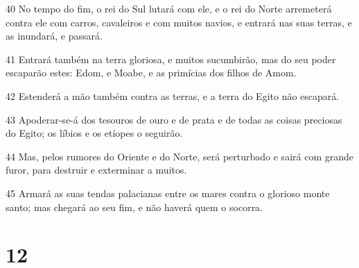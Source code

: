 \par 40 No tempo do fim, o rei do Sul lutará com ele, e o rei do Norte arremeterá contra ele com carros, cavaleiros e com muitos navios, e entrará nas suas terras, e as inundará, e passará.
\par 41 Entrará também na terra gloriosa, e muitos sucumbirão, mas do seu poder escaparão estes: Edom, e Moabe, e as primícias dos filhos de Amom.
\par 42 Estenderá a mão também contra as terras, e a terra do Egito não escapará.
\par 43 Apoderar-se-á dos tesouros de ouro e de prata e de todas as coisas preciosas do Egito; os líbios e os etíopes o seguirão.
\par 44 Mas, pelos rumores do Oriente e do Norte, será perturbado e sairá com grande furor, para destruir e exterminar a muitos.
\par 45 Armará as suas tendas palacianas entre os mares contra o glorioso monte santo; mas chegará ao seu fim, e não haverá quem o socorra.

\chapter{12}

